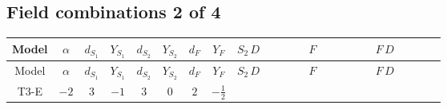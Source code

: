 \documentclass[8pt]{article}
\begin{document}
\begin{landscape}
\subsection*{Field combinations 2 of 4}
\begin{longtable}{@{}cccccccc >{\raggedright\arraybackslash}p{0.21\linewidth} >{\raggedright\arraybackslash}p{0.21\linewidth} >{\raggedright\arraybackslash}p{0.21\linewidth}@{}}
\toprule
Model & $\alpha$ & $d_{S_1}$ & $Y_{S_1}$ & $d_{S_2}$ & $Y_{S_2}$ & $d_F$ & $Y_F$ & $S_2\,D$ & $F$ & $F\,D$ \\
\midrule
\endfirsthead
\toprule
Model & $\alpha$ & $d_{S_1}$ & $Y_{S_1}$ & $d_{S_2}$ & $Y_{S_2}$ & $d_F$ & $Y_F$ & $S_2\,D$ & $F$ & $F\,D$ \\
\midrule
\endhead
T3-E & $-2$ & $3$ & $-1$ & $3$ & $0$ & $2$ & $-\frac{1}{2}$ & \scriptsize\adjustbox{max width=\linewidth}{$\begin{gathered} +D_{\mu _1}\left(S_{2,j_1}\right){}^{\dagger } D_{\mu _1}\left(S_{2,j_1}\right)\end{gathered}$} & \scriptsize\adjustbox{max width=\linewidth}{$\begin{gathered} -\overline{F_{j_1,r_1}}\, F_{j_1,r_1} M_F\end{gathered}$} & \scriptsize\adjustbox{max width=\linewidth}{$\begin{gathered} +i \overline{F_{j_1,r_1}}\, \gamma ^{\mu _1}\, D_{\mu _1}\left(F_{j_1,r_1}\right)\end{gathered}$} \\
\midrule
\bottomrule
\end{longtable}
\clearpage

\end{landscape}
\end{document}
